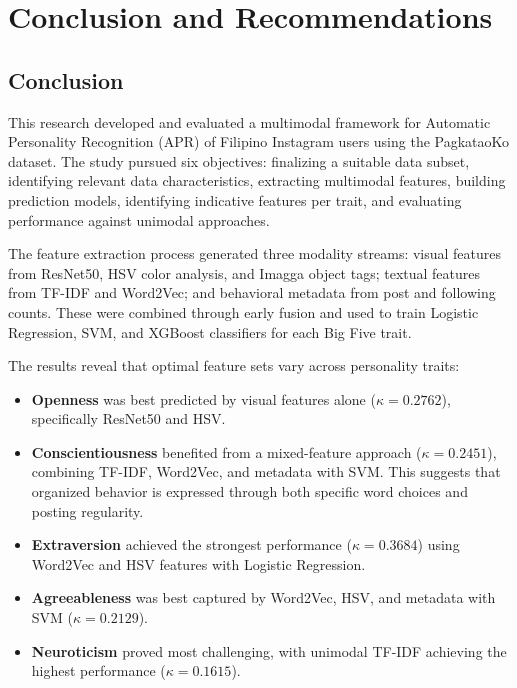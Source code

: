 \chapter{Conclusion and Recommendations}

\section{Conclusion}

This research developed and evaluated a multimodal framework for Automatic Personality Recognition (APR) of Filipino Instagram users using the PagkataoKo dataset. The study pursued six objectives: finalizing a suitable data subset, identifying relevant data characteristics, extracting multimodal features, building prediction models, identifying indicative features per trait, and evaluating performance against unimodal approaches.

The feature extraction process generated three modality streams: visual features from ResNet50, HSV color analysis, and Imagga object tags; textual features from TF-IDF and Word2Vec; and behavioral metadata from post and following counts. These were combined through early fusion and used to train Logistic Regression, SVM, and XGBoost classifiers for each Big Five trait.

The results reveal that optimal feature sets vary across personality traits:

\begin{itemize}
	
	\item \textbf{Openness} was best predicted by visual features alone (\(\kappa = 0.2762\)), specifically ResNet50 and HSV.
	
	\item \textbf{Conscientiousness} benefited from a mixed-feature approach (\(\kappa = 0.2451\)), combining TF-IDF, Word2Vec, and metadata with SVM. This suggests that organized behavior is expressed through both specific word choices and posting regularity.
	
	\item \textbf{Extraversion} achieved the strongest performance (\(\kappa = 0.3684\)) using Word2Vec and HSV features with Logistic Regression.
	
	\item \textbf{Agreeableness} was best captured by Word2Vec, HSV, and metadata with SVM (\(\kappa = 0.2129\)).
	
	\item \textbf{Neuroticism} proved most challenging, with unimodal TF-IDF achieving the highest performance (\(\kappa = 0.1615\)).
	
\end{itemize}

